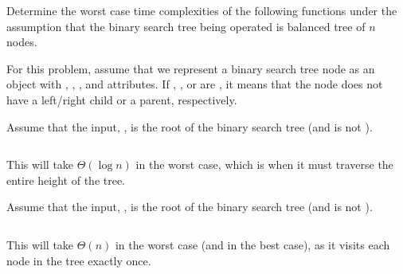 \begin{prob}
    Determine the worst case time complexities of the following functions under
    the assumption that the binary search tree being operated is balanced tree
    of $n$ nodes.

    For this problem, assume that we represent a binary search tree node as an
    object with , , , and
     attributes. If , , or
     are , it means that the node does not have a
    left/right child or a parent, respectively.

    \begin{subprobset}
        \begin{subprob}
            Assume that the input, , is the root of the binary search tree (and
            is not ).

            \inputminted{python}{\thisdir/include/foo.py}

            \begin{soln}
                This will take $\Theta(\log n)$ in the worst case, which is
                when it must traverse the entire height of the tree.
            \end{soln}
        \end{subprob}

        \begin{subprob}
            Assume that the input, , is the root of the binary search
            tree (and is not ).

            \inputminted{python}{\thisdir/include/bar.py}

            \begin{soln}
                This will take $\Theta(n)$ in the worst case (and in the best case),
                as it visits each node in the tree exactly once.
            \end{soln}
        \end{subprob}

    \end{subprobset}


\end{prob}
